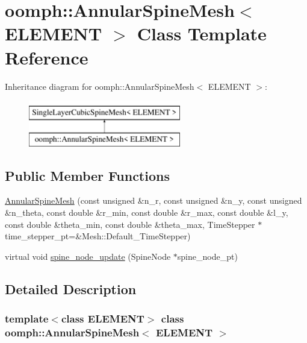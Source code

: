 \hypertarget{classoomph_1_1AnnularSpineMesh}{}\section{oomph\+:\+:Annular\+Spine\+Mesh$<$ E\+L\+E\+M\+E\+NT $>$ Class Template Reference}
\label{classoomph_1_1AnnularSpineMesh}
Inheritance diagram for oomph\+:\+:Annular\+Spine\+Mesh$<$ E\+L\+E\+M\+E\+NT $>$\+:\begin{figure}[H]
\begin{center}
\leavevmode
\includegraphics[height=2.000000cm]{classoomph_1_1AnnularSpineMesh}
\end{center}
\end{figure}
\subsection*{Public Member Functions}
\begin{DoxyCompactItemize}
\item 
\hyperlink{classoomph_1_1AnnularSpineMesh_af34e5562ca72806c2ec0b285495b75bc}{Annular\+Spine\+Mesh} (const unsigned \&n\+\_\+r, const unsigned \&n\+\_\+y, const unsigned \&n\+\_\+theta, const double \&r\+\_\+min, const double \&r\+\_\+max, const double \&l\+\_\+y, const double \&theta\+\_\+min, const double \&theta\+\_\+max, Time\+Stepper $\ast$time\+\_\+stepper\+\_\+pt=\&Mesh\+::\+Default\+\_\+\+Time\+Stepper)
\item 
virtual void \hyperlink{classoomph_1_1AnnularSpineMesh_abbdfd1078b2d798f5f5abadb817f58cb}{spine\+\_\+node\+\_\+update} (Spine\+Node $\ast$spine\+\_\+node\+\_\+pt)
\end{DoxyCompactItemize}


\subsection{Detailed Description}
\subsubsection*{template$<$class E\+L\+E\+M\+E\+NT$>$\newline
class oomph\+::\+Annular\+Spine\+Mesh$<$ E\+L\+E\+M\+E\+N\+T $>$}

